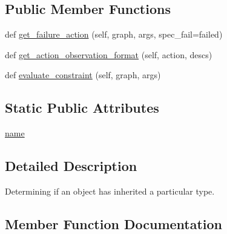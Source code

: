 \subsection*{Public Member Functions}
\begin{DoxyCompactItemize}
\item 
def \hyperlink{classlight__chats_1_1graph_1_1NotTypeConstraint_a006f37da6afe1dd06db790a6d19b07db}{get\+\_\+failure\+\_\+action} (self, graph, args, spec\+\_\+fail=\textquotesingle{}failed\textquotesingle{})
\item 
def \hyperlink{classlight__chats_1_1graph_1_1NotTypeConstraint_a5676df24e75c1823bd7b555a266de5f3}{get\+\_\+action\+\_\+observation\+\_\+format} (self, action, descs)
\item 
def \hyperlink{classlight__chats_1_1graph_1_1NotTypeConstraint_a14b047c243e378910ac24f6a2e7571e9}{evaluate\+\_\+constraint} (self, graph, args)
\end{DoxyCompactItemize}
\subsection*{Static Public Attributes}
\begin{DoxyCompactItemize}
\item 
\hyperlink{classlight__chats_1_1graph_1_1NotTypeConstraint_ad6119b9dbdfc0d1049e91e3f46832601}{name}
\end{DoxyCompactItemize}


\subsection{Detailed Description}
\begin{DoxyVerb}Determining if an object has inherited a particular type.
\end{DoxyVerb}
 

\subsection{Member Function Documentation}
\mbox{\label{classlight__chats_1_1graph_1_1NotTypeConstraint_a14b047c243e378910ac24f6a2e7571e9}} 
